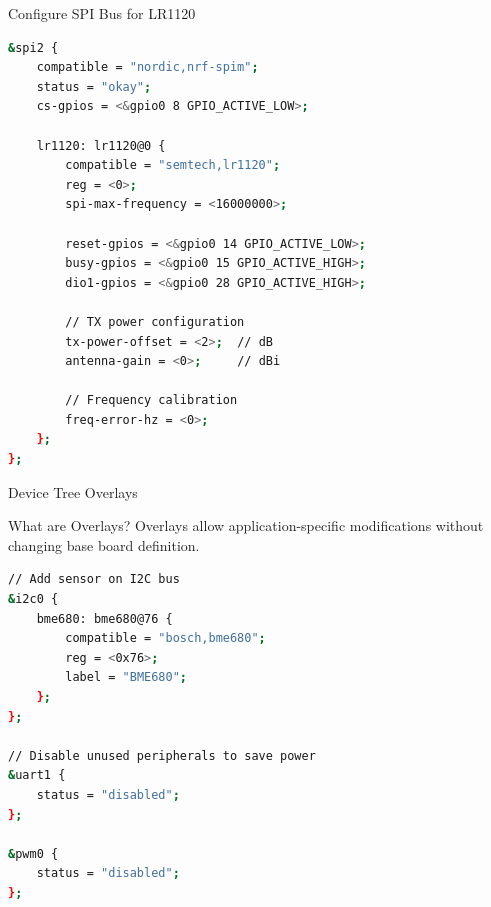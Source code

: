 \documentclass{beamer}
\begin{document}
\begin{frame}[fragile]{Configure SPI Bus for LR1120}
\begin{lstlisting}[language=bash, caption={SPI and GPIO Configuration}]
&spi2 {
    compatible = "nordic,nrf-spim";
    status = "okay";
    cs-gpios = <&gpio0 8 GPIO_ACTIVE_LOW>;

    lr1120: lr1120@0 {
        compatible = "semtech,lr1120";
        reg = <0>;
        spi-max-frequency = <16000000>;

        reset-gpios = <&gpio0 14 GPIO_ACTIVE_LOW>;
        busy-gpios = <&gpio0 15 GPIO_ACTIVE_HIGH>;
        dio1-gpios = <&gpio0 28 GPIO_ACTIVE_HIGH>;

        // TX power configuration
        tx-power-offset = <2>;  // dB
        antenna-gain = <0>;     // dBi

        // Frequency calibration
        freq-error-hz = <0>;
    };
};
\end{lstlisting}
\end{frame}

\begin{frame}[fragile]{Device Tree Overlays}
\begin{block}{What are Overlays?}
Overlays allow application-specific modifications without changing base board definition.
\end{block}

\vspace{0.3cm}

\begin{lstlisting}[language=bash, caption={myapp.overlay}]
// Add sensor on I2C bus
&i2c0 {
    bme680: bme680@76 {
        compatible = "bosch,bme680";
        reg = <0x76>;
        label = "BME680";
    };
};

// Disable unused peripherals to save power
&uart1 {
    status = "disabled";
};

&pwm0 {
    status = "disabled";
};
\end{lstlisting}
\end{frame}
\end{document}
